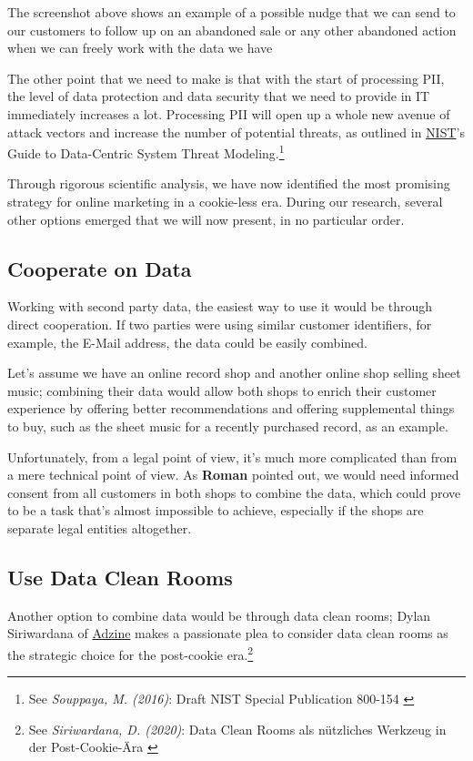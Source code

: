 The screenshot above shows an example of a possible nudge that we can send to our customers to follow up on an abandoned sale or any other abandoned action when we can freely work with the data we have

The other point that we need to make is that with the start of processing PII, the level of data protection and data security that we need to provide in IT immediately increases a lot. Processing PII will open up a whole new avenue of attack vectors and increase the number of potential threats, as outlined in \href{https://www.nist.gov/}{NIST}'s Guide to Data-Centric System Threat Modeling.\footnote{See \textit{Souppaya, M. (2016)}: Draft NIST Special Publication 800-154 \cite{sp800_154_draft}}

Through rigorous scientific analysis, we have now identified the most promising strategy for online marketing in a cookie-less era. During our research, several other options emerged that we will now present, in no particular order.

\subsection{Cooperate on Data}

Working with second party data, the easiest way to use it would be through direct cooperation. If two parties were using similar customer identifiers, for example, the E-Mail address, the data could be easily combined. 

Let's assume we have an online record shop and another online shop selling sheet music; combining their data would allow both shops to enrich their customer experience by offering better recommendations and offering supplemental things to buy, such as the sheet music for a recently purchased record, as an example.

Unfortunately, from a legal point of view, it's much more complicated than from a mere technical point of view. As \textbf{Roman} pointed out, we would need informed consent from all customers in both shops to combine the data, which could prove to be a task that's almost impossible to achieve, especially if the shops are separate legal entities altogether.

\subsection{Use Data Clean Rooms}

Another option to combine data would be through data clean rooms; Dylan Siriwardana of \href{https://www.adzine.de/}{Adzine} makes a passionate plea to consider data clean rooms as the strategic choice for the post-cookie era.\footnote{See \textit{Siriwardana, D. (2020)}: Data Clean Rooms als nützliches Werkzeug in der Post-Cookie-Ära \cite{dataClean}}

